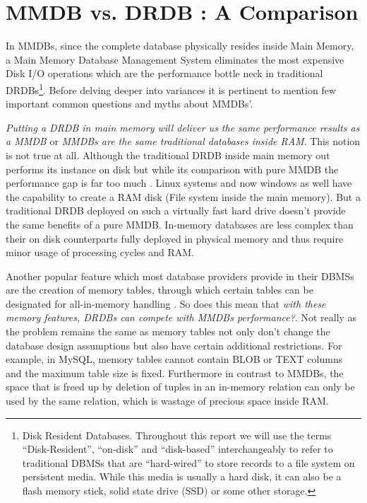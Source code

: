 \documentclass[10pt]{article} %
\begin{document}
\section{MMDB vs. DRDB : A Comparison}
In MMDBs, since the complete database physically resides inside Main Memory, a Main Memory Database Management System eliminates the most expensive Disk I/O operations which are the performance bottle neck in traditional DRDBs\footnote{Disk Resident Databases. Throughout this report we will use the terms “Disk-Resident”, “on-disk” and “disk-based” interchangeably to refer to traditional DBMSs that are “hard-wired” to store records to a file system on persistent media. While this media is usually a hard disk, it can also be a flash memory stick, solid state drive (SSD) or some other storage.}. Before delving deeper into variances it is pertinent to mention few important common questions and myths about MMDBs’.

\emph{Putting a DRDB in main memory will deliver us the same performance results as a MMDB} or \emph{MMDBs are the same traditional databases inside RAM}. This notion is not true at all. Although the traditional DRDB inside main memory out performs its instance on disk but while its comparison with pure MMDB the performance gap is far too much \cite{Mcobject-ramdisk}. Linux systems and now windows as well have the capability to create a RAM disk (File system inside the main memory). But a traditional DRDB deployed on such a virtually fast hard drive doesn't provide the same benefits of a pure MMDB. In-memory databases are less complex than their on disk counterparts fully deployed in physical memory and thus require minor usage of processing cycles and RAM.

Another popular feature which most database providers provide in their DBMSs are the creation of memory tables, through which certain tables can be designated for all-in-memory handling \cite{Mcobject-Myths}. So does this mean that \emph{with these memory features, DRDBs can compete with MMDBs performance?}. Not really as the problem remains the same as memory tables not only don't change the database design assumptions but also have certain additional restrictions. For example, in MySQL, memory tables cannot contain BLOB or TEXT columns and the maximum table size is fixed. Furthermore in contrast to MMDBs, the space that is freed up by deletion of tuples in an in-memory relation can only be used by the same relation, which is wastage of precious space inside RAM.
\end{document}
